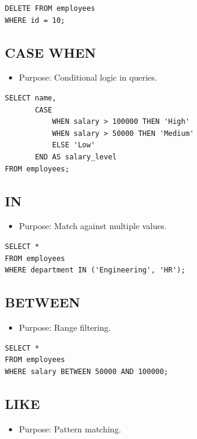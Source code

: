 \documentclass[10pt]{article}
\begin{document}
\begin{verbatim}
DELETE FROM employees
WHERE id = 10;
\end{verbatim}

\subsection{CASE WHEN}
\begin{itemize}
    \item Purpose: Conditional logic in queries.
\end{itemize}

\begin{verbatim}
SELECT name,
       CASE
           WHEN salary > 100000 THEN 'High'
           WHEN salary > 50000 THEN 'Medium'
           ELSE 'Low'
       END AS salary_level
FROM employees;
\end{verbatim}

\subsection{IN}
\begin{itemize}
    \item Purpose: Match against multiple values.
\end{itemize}

\begin{verbatim}
SELECT *
FROM employees
WHERE department IN ('Engineering', 'HR');
\end{verbatim}

\subsection{BETWEEN}
\begin{itemize}
    \item Purpose: Range filtering.
\end{itemize}

\begin{verbatim}
SELECT *
FROM employees
WHERE salary BETWEEN 50000 AND 100000;
\end{verbatim}

\subsection{LIKE}
\begin{itemize}
    \item Purpose: Pattern matching.
\end{itemize}
\end{document}
